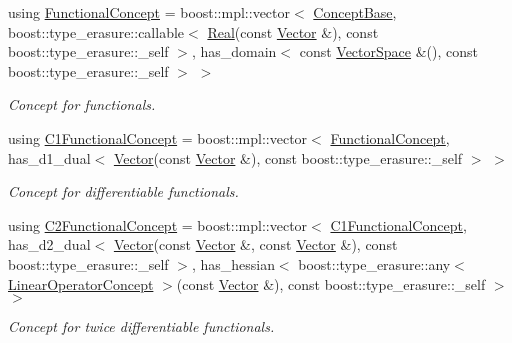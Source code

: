\begin{DoxyCompactItemize}
using \hyperlink{group__ConceptGroup_ga5273b50bd3e8c9a3f5a1e6b5f170836d_ga5273b50bd3e8c9a3f5a1e6b5f170836d}{Functional\+Concept} = boost\+::mpl\+::vector$<$ \hyperlink{group__ConceptGroup_ga63426675cc05ccce03ead56a4fa90d96_ga63426675cc05ccce03ead56a4fa90d96}{Concept\+Base}, boost\+::type\+\_\+erasure\+::callable$<$ \hyperlink{classSpacy_1_1Real}{Real}(const \hyperlink{classSpacy_1_1Vector}{Vector} \&), const boost\+::type\+\_\+erasure\+::\+\_\+self $>$, has\+\_\+domain$<$ const \hyperlink{classSpacy_1_1VectorSpace}{Vector\+Space} \&(), const boost\+::type\+\_\+erasure\+::\+\_\+self $>$ $>$
\begin{DoxyCompactList}\small\item\em Concept for functionals. \end{DoxyCompactList}\item 
using \hyperlink{group__ConceptGroup_ga205b55d8291e0f2e143f116cf78bc54f_ga205b55d8291e0f2e143f116cf78bc54f}{C1\+Functional\+Concept} = boost\+::mpl\+::vector$<$ \hyperlink{group__ConceptGroup_ga5273b50bd3e8c9a3f5a1e6b5f170836d_ga5273b50bd3e8c9a3f5a1e6b5f170836d}{Functional\+Concept}, has\+\_\+d1\+\_\+dual$<$ \hyperlink{classSpacy_1_1Vector}{Vector}(const \hyperlink{classSpacy_1_1Vector}{Vector} \&), const boost\+::type\+\_\+erasure\+::\+\_\+self $>$ $>$
\begin{DoxyCompactList}\small\item\em Concept for differentiable functionals. \end{DoxyCompactList}\item 
using \hyperlink{group__ConceptGroup_gafb4414561b07b27100cad81ecf152e47_gafb4414561b07b27100cad81ecf152e47}{C2\+Functional\+Concept} = boost\+::mpl\+::vector$<$ \hyperlink{group__ConceptGroup_ga205b55d8291e0f2e143f116cf78bc54f_ga205b55d8291e0f2e143f116cf78bc54f}{C1\+Functional\+Concept}, has\+\_\+d2\+\_\+dual$<$ \hyperlink{classSpacy_1_1Vector}{Vector}(const \hyperlink{classSpacy_1_1Vector}{Vector} \&, const \hyperlink{classSpacy_1_1Vector}{Vector} \&), const boost\+::type\+\_\+erasure\+::\+\_\+self $>$, has\+\_\+hessian$<$ boost\+::type\+\_\+erasure\+::any$<$ \hyperlink{group__ConceptGroup_gaf0e18e41c434cfceb77ccb8e785a8055_gaf0e18e41c434cfceb77ccb8e785a8055}{Linear\+Operator\+Concept} $>$(const \hyperlink{classSpacy_1_1Vector}{Vector} \&), const boost\+::type\+\_\+erasure\+::\+\_\+self $>$ $>$
\begin{DoxyCompactList}\small\item\em Concept for twice differentiable functionals. \end{DoxyCompactList}\item 

\end{DoxyCompactItemize}
